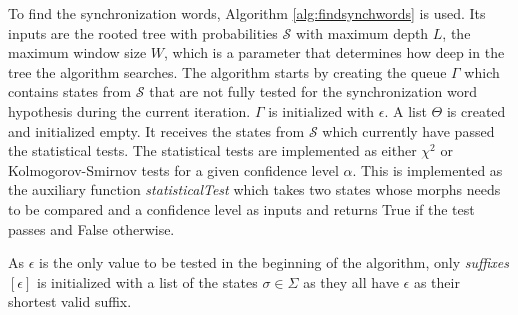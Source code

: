 {To find the synchronization words, Algorithm \ref{alg:findsynchwords} is used. Its inputs are the rooted tree with probabilities $\mathcal{S}$ with maximum depth $L$, the maximum window size $W$, which is a parameter that determines how deep in the tree the algorithm searches. The algorithm starts by creating the queue $\Gamma$ which contains states from $\mathcal{S}$ that are not fully tested for the synchronization word hypothesis during the current iteration. $\Gamma$ is initialized with $\epsilon$. A list $\Theta$ is created and initialized empty. It receives the states from $\mathcal{S}$ which currently have passed the statistical tests. The statistical tests are implemented as either $\chi^2$ or Kolmogorov-Smirnov tests for a given confidence level $\alpha$. This is implemented as the auxiliary function \textit{statisticalTest} which takes two states whose morphs needs to be compared and a confidence level as inputs and returns True if the test passes and False otherwise.

As $\epsilon$ is the only value to be tested in the beginning of the algorithm, only \textit{suffixes}$[\epsilon]$ is initialized with a list of the states  $\sigma \in \Sigma$ as they all have $\epsilon$ as their shortest valid suffix. 

 
 
 
 
 
}
